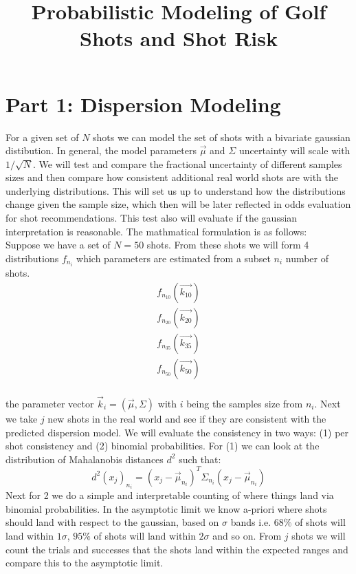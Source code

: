 \documentclass{article}
\title{Probabilistic Modeling of Golf Shots and Shot Risk}
\begin{document}
\maketitle


\section{Part 1: Dispersion Modeling}
For a given set of $N$ shots we can model the set of shots with a bivariate gaussian distibution. In general, the model parameters $\vec{\mu}$ and $\Sigma$ uncertainty will scale with $1/\sqrt{N}$. We will test and compare the fractional uncertainty of different samples sizes and then compare how consistent additional real world shots are with the underlying distributions. This will set us up to understand how the distributions change given the sample size, which then will be later reflected in odds evaluation for shot recommendations. This test also will evaluate if the gaussian interpretation is reasonable. The mathmatical formulation is as follows:\\


Suppose we have a set of $N=50$ shots. From these shots we will form 4 distributions $f_{n_i}$ which parameters are estimated from a subset $n_i$ number of shots.
\begin{equation}
\begin{split}
f_{n_{10}}( \vec{k_{10}} ) \\
f_{n_{20}}( \vec{k_{20}} ) \\
f_{n_{35}}( \vec{k_{35}} ) \\
f_{n_{50}}( \vec{k_{50}} ) \\
\end{split}
\end{equation}

the parameter vector $\vec{k}_i = (\vec{\mu}, \Sigma)$ with $i$ being the samples size from $n_i$. Next we take $j$ new shots in the real world and see if they are consistent with the predicted dispersion model. We will evaluate the consistency in two ways: (1) per shot consistency and (2) binomial probabilities. For (1) we can look at the distribution of Mahalanobis distances $d^2$ such that:
\begin{equation}
d^2(x_j)_{n_i} = (x_j-\vec{\mu}_{n_i})^T \Sigma_{n_i} (x_j-\vec{\mu}_{n_i})
\end{equation}
Next for 2 we do a simple and interpretable counting of where things land via binomial probabilities. In the asymptotic limit we know a-priori where shots should land with respect to the gaussian, based on $\sigma$ bands i.e. $68\%$ of shots will land within $1\sigma$, $95\%$ of shots will land within $2\sigma$ and so on. From $j$ shots we will count the trials and successes that the shots land within the expected ranges and compare this to the asymptotic limit.
\end{document}
